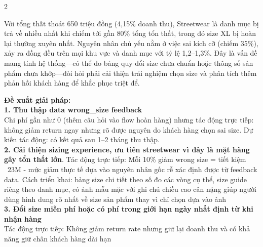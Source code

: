 \documentclass{article}
\begin{document}
\begin{multicols}{2}
\begin{center}
\begin{minipage}{\linewidth}
        \label{fig:three_charts}
    \end{minipage}
\end{center}

Với tổng thất thoát 650 triệu đồng (4,15\% doanh thu), Streetwear là danh mục bị trả về nhiều nhất khi chiếm tới gần 80\% tổng tổn thất, trong đó size XL bị hoàn lại thường xuyên nhất. Nguyên nhân chủ yếu nằm ở việc sai kích cỡ (chiếm 35\%), xảy ra đồng đều trên mọi khu vực và danh mục với tỷ lệ 1,2–1,3\%. Đây là vấn đề mang tính hệ thống—có thể do bảng quy đổi size chưa chuẩn hoặc thông số sản phẩm chưa khớp—đòi hỏi phải cải thiện trải nghiệm chọn size và phân tích thêm phản hồi khách hàng để khắc phục triệt để.


\textbf{Đề xuất giải pháp:}\\
\textbf{1. Thu thập data wrong_size feedback} \\
Chi phí gần như 0 (thêm câu hỏi vào flow hoàn hàng) nhưng tác động trực tiếp: không giảm return ngay nhưng rõ được nguyên do khách hàng chọn sai size. Dự kiến tác động: có kết quả sau 1–2 tháng thu thập. \\
\textbf{2. Cải thiện sizing experience, ưu tiên streetwear vì đây là mặt hàng gây tổn thất lớn}. Tác động trực tiếp: Mỗi 10\% giảm wrong size = tiết kiệm ~23M - mức giảm thực tế dựa vào nguyên nhân gốc rễ xác định được từ feedback data. Cách triển khai: bảng size chi tiết theo số đo các vòng cụ thể, size guide riêng theo danh mục, có ảnh mẫu mặc với ghi chú chiều cao cân nặng giúp người dùng hình dung rõ nhất về size sản phẩm thay vì chỉ chọn dựa vào ảnh \\
\textbf{3. Đổi size miễn phí hoặc có phí trong giới hạn ngày nhất định từ khi nhận hàng } \\
Tác động trực tiếp: Không giảm return rate nhưng giữ lại doanh thu và có khả năng giữ chân khách hàng dài hạn 

\end{multicols}
\end{document}
